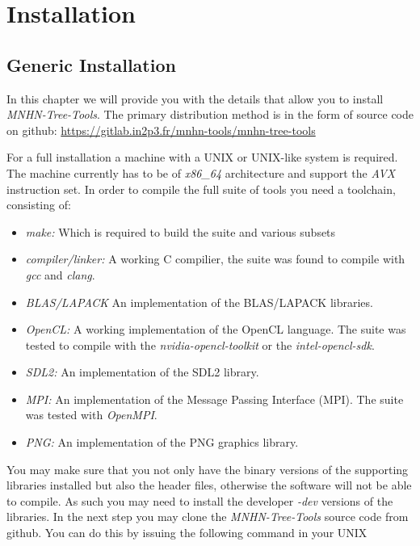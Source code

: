 \chapter{Installation}

\section{Generic Installation} \label{sec-inst-generic}

In this chapter we will provide you with the details that allow you to
install \emph{MNHN-Tree-Tools}. The primary distribution method is in the
form of source code on github: \newline
\url{https://gitlab.in2p3.fr/mnhn-tools/mnhn-tree-tools} \newline

For a full installation a machine with a UNIX or UNIX-like system
is required. The machine currently has to be of \emph{x86\_64}
architecture and support the \emph{AVX} instruction set. In order to
compile the full suite of tools you need a toolchain, consisting of:
\begin{itemize}
\item \emph{make:} Which is required to build the suite and various subsets
\item \emph{compiler/linker:} A working C compilier, the suite was found to
  compile with \emph{gcc} and \emph{clang}.
\item \emph{BLAS/LAPACK} An implementation of the BLAS/LAPACK
  libraries.
\item \emph{OpenCL:} A working implementation of the OpenCL
  language. The suite was tested to compile with the
  \emph{nvidia-opencl-toolkit} or the \emph{intel-opencl-sdk}.
\item \emph{SDL2:} An implementation of the SDL2 library.
\item \emph{MPI:} An implementation of the Message Passing Interface
  (MPI). The suite was tested with \emph{OpenMPI}.
\item \emph{PNG:} An implementation of the PNG graphics library.
\end{itemize}
You may make sure that you not only have the binary versions of the
supporting libraries installed but also the header files, otherwise
the software will not be able to compile. As such you may need to
install the developer \emph{-dev} versions of the libraries. In the
next step you may clone the \emph{MNHN-Tree-Tools} source code from github.
You can do this by issuing the following command in your UNIX
